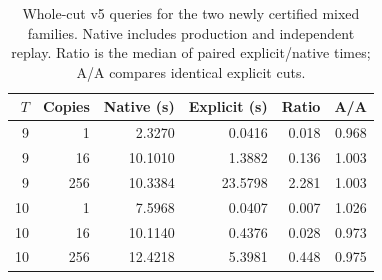 \begin{table}[htbp]
\centering
\begin{tabular}{rrrrrr}
\toprule
$T$ & Copies & Native (s) & Explicit (s) & Ratio & A/A \\
\midrule
9 & 1 & 2.3270 & 0.0416 & 0.018 & 0.968 \\
9 & 16 & 10.1010 & 1.3882 & 0.136 & 1.003 \\
9 & 256 & 10.3384 & 23.5798 & 2.281 & 1.003 \\
10 & 1 & 7.5968 & 0.0407 & 0.007 & 1.026 \\
10 & 16 & 10.1140 & 0.4376 & 0.028 & 0.973 \\
10 & 256 & 12.4218 & 5.3981 & 0.448 & 0.975 \\
\bottomrule
\end{tabular}
\caption{Whole-cut v5 queries for the two newly certified mixed families. Native includes production and independent replay. Ratio is the median of paired explicit/native times; A/A compares identical explicit cuts.}
\label{marked-cut:boundary-kernel-timings}
\end{table}
